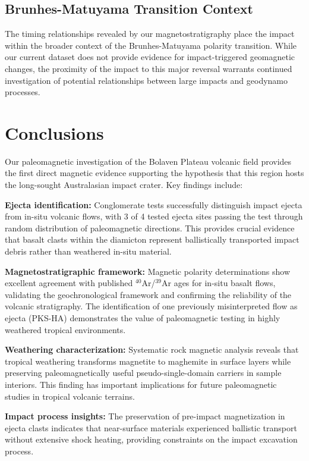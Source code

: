 \documentclass[twocolumn,11pt]{article}
\begin{document}
\subsection{Brunhes-Matuyama Transition Context}

The timing relationships revealed by our magnetostratigraphy place the impact within the broader context of the Brunhes-Matuyama polarity transition. While our current dataset does not provide evidence for impact-triggered geomagnetic changes, the proximity of the impact to this major reversal warrants continued investigation of potential relationships between large impacts and geodynamo processes.

\section{Conclusions}

Our paleomagnetic investigation of the Bolaven Plateau volcanic field provides the first direct magnetic evidence supporting the hypothesis that this region hosts the long-sought Australasian impact crater. Key findings include:

\textbf{Ejecta identification:} Conglomerate tests successfully distinguish impact ejecta from in-situ volcanic flows, with 3 of 4 tested ejecta sites passing the test through random distribution of paleomagnetic directions. This provides crucial evidence that basalt clasts within the diamicton represent ballistically transported impact debris rather than weathered in-situ material.

\textbf{Magnetostratigraphic framework:} Magnetic polarity determinations show excellent agreement with published $^{40}$Ar/$^{39}$Ar ages for in-situ basalt flows, validating the geochronological framework and confirming the reliability of the volcanic stratigraphy. The identification of one previously misinterpreted flow as ejecta (PKS-HA) demonstrates the value of paleomagnetic testing in highly weathered tropical environments.

\textbf{Weathering characterization:} Systematic rock magnetic analysis reveals that tropical weathering transforms magnetite to maghemite in surface layers while preserving paleomagnetically useful pseudo-single-domain carriers in sample interiors. This finding has important implications for future paleomagnetic studies in tropical volcanic terrains.

\textbf{Impact process insights:} The preservation of pre-impact magnetization in ejecta clasts indicates that near-surface materials experienced ballistic transport without extensive shock heating, providing constraints on the impact excavation process.
\end{document}
